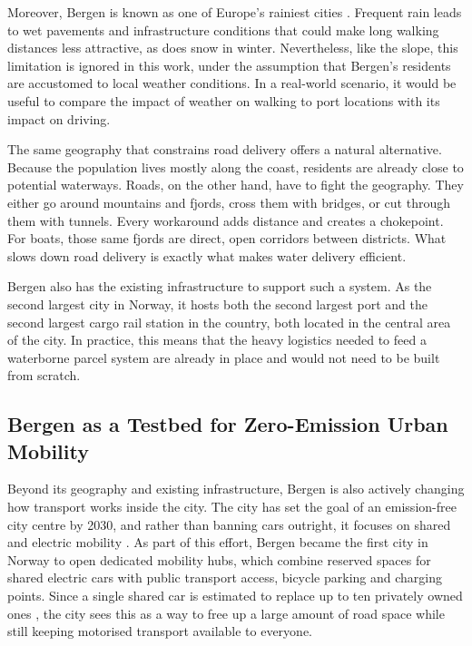 \documentclass[12pt]{article}
\begin{document}
Moreover, Bergen is known as one of Europe's rainiest cities \parencite{BREMER2020100236}. Frequent rain leads to wet pavements and infrastructure conditions that could make long walking distances less attractive, as does snow in winter. Nevertheless, like the slope, this limitation is ignored in this work, under the assumption that Bergen's residents are accustomed to local weather conditions. In a real-world scenario, it would be useful to compare the impact of weather on walking to port locations with its impact on driving.

The same geography that constrains road delivery offers a natural alternative. Because the population lives mostly along the coast, residents are already close to potential waterways. Roads, on the other hand, have to fight the geography. They either go around mountains and fjords, cross them with bridges, or cut through them with tunnels. Every workaround adds distance and creates a chokepoint. For boats, those same fjords are direct, open corridors between districts. What slows down road delivery is exactly what makes water delivery efficient.

Bergen also has the existing infrastructure to support such a system. As the second largest city in Norway, it hosts both the second largest port \parencite{bergenport} and the second largest cargo rail station \parencite{bergenrail} in the country, both located in the central area of the city. In practice, this means that the heavy logistics needed to feed a waterborne parcel system are already in place and would not need to be built from scratch.

\subsection{Bergen as a Testbed for Zero-Emission Urban Mobility}
\label{subsec:zero-emission-mobility}

Beyond its geography and existing infrastructure, Bergen is also actively changing how transport works inside the city. The city has set the goal of an emission-free city centre by 2030, and rather than banning cars outright, it focuses on shared and electric mobility \parencite{investbergen_sharedmobility}. As part of this effort, Bergen became the first city in Norway to open dedicated mobility hubs, which combine reserved spaces for shared electric cars with public transport access, bicycle parking and charging points. Since a single shared car is estimated to replace up to ten privately owned ones \parencite{investbergen_sharedmobility}, the city sees this as a way to free up a large amount of road space while still keeping motorised transport available to everyone.
\end{document}

